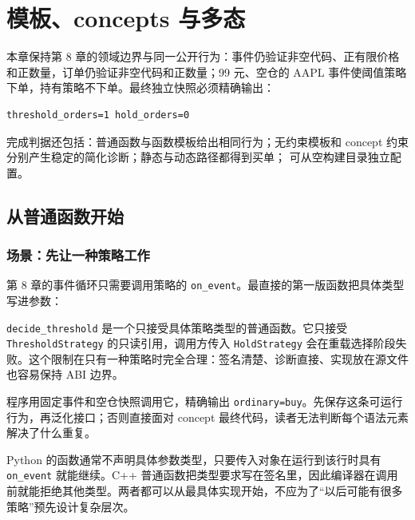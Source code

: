 \chapter{模板、concepts 与多态}


本章保持第 8 章的领域边界与同一公开行为：事件仍验证非空代码、正有限价格和正数量，订单仍验证非空代码和正数量；99 元、空仓的 AAPL 事件使阈值策略下单，持有策略不下单。最终独立快照必须精确输出：

\begin{lstlisting}
threshold_orders=1 hold_orders=0
\end{lstlisting}

完成判据还包括：普通函数与函数模板给出相同行为；无约束模板和 concept 约束分别产生稳定的简化诊断；静态与动态路径都得到买单； 可从空构建目录独立配置。

\section{从普通函数开始}

\subsection{场景：先让一种策略工作}

第 8 章的事件循环只需要调用策略的 \texttt{on\_event}。最直接的第一版函数把具体类型写进参数：



\texttt{decide\_threshold} 是一个只接受具体策略类型的普通函数。它只接受 \texttt{ThresholdStrategy} 的只读引用，调用方传入 \texttt{HoldStrategy} 会在重载选择阶段失败。这个限制在只有一种策略时完全合理：签名清楚、诊断直接、实现放在源文件也容易保持 ABI 边界。

程序用固定事件和空仓快照调用它，精确输出 \texttt{ordinary=buy}。先保存这条可运行行为，再泛化接口；否则直接面对 concept 最终代码，读者无法判断每个语法元素解决了什么重复。

\begin{pythonbridge}
Python 的函数通常不声明具体参数类型，只要传入对象在运行到该行时具有 \texttt{on\_event} 就能继续。C++ 普通函数把类型要求写在签名里，因此编译器在调用前就能拒绝其他类型。两者都可以从最具体实现开始，不应为了“以后可能有很多策略”预先设计复杂层次。

\end{pythonbridge}


